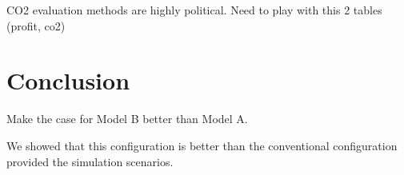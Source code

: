 \documentclass[12pt]{article}
\begin{document}
CO2 evaluation methods are highly political. Need to play with this 2 tables (profit, co2)

\section{Conclusion}

Make the case for Model B better than Model A. 

We showed that this configuration is better than the conventional configuration provided the simulation scenarios. 
\end{document}
